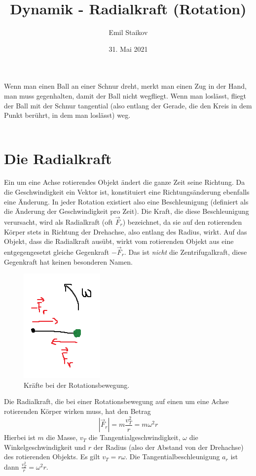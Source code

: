 \documentclass[11pt]{article}
\title{Dynamik - Radialkraft (Rotation)}
\author{Emil Staikov}
\date{31. Mai 2021}
\begin{document}
\maketitle
Wenn man einen Ball an einer Schnur dreht, merkt man einen Zug in der Hand, man muss gegenhalten, damit der Ball nicht wegfliegt. Wenn man loslässt, fliegt der Ball mit der Schnur tangential (also entlang der Gerade, die den Kreis in dem Punkt berührt, in dem man loslässt) weg. \\\\


\section{Die Radialkraft}
Ein um eine Achse rotierendes Objekt ändert die ganze Zeit seine Richtung. Da die Geschwindigkeit ein Vektor ist, konstituiert eine Richtungsänderung ebenfalls eine Änderung. In jeder Rotation existiert also eine Beschleunigung (definiert als die Änderung der Geschwindigkeit pro Zeit). Die Kraft, die diese Beschleunigung verursacht, wird als Radialkraft (oft $\vec{F}_r$) bezeichnet, da sie auf den rotierenden Körper stets in Richtung der Drehachse, also entlang des Radius, wirkt. Auf das Objekt, dass die Radialkraft ausübt, wirkt vom rotierenden Objekt aus eine entgegengesetzt gleiche Gegenkraft $-\vec{F}_r$. Das ist \textit{nicht} die Zentrifugalkraft, diese Gegenkraft hat keinen besonderen Namen. 
\begin{figure}[H]
    \centering
    \includegraphics{abb/5-rotation-radialkraft/radialkraft.png}
    \caption{Kräfte bei der Rotationsbewegung. }
\end{figure} 

\noindent Die Radialkraft, die bei einer Rotationsbewegung auf einen um eine Achse rotierenden Körper wirken muss, hat den Betrag 
\begin{equation*}
    |\vec{F}_r| = m\frac{v_T^2}{r} = m\omega^2r
\end{equation*}
Hierbei ist $m$ die Masse, $v_T$ die Tangentialgeschwindigkeit, $\omega$ die Winkelgeschwindigkeit und $r$ der Radius (also der Abstand von der Drehachse) des rotierenden Objekts. Es gilt $v_T = r\omega$. Die Tangentialbeschleunigung $a_r$ ist dann $\frac{v_T^2}{r} = \omega^2r$. \\\\
\end{document}
